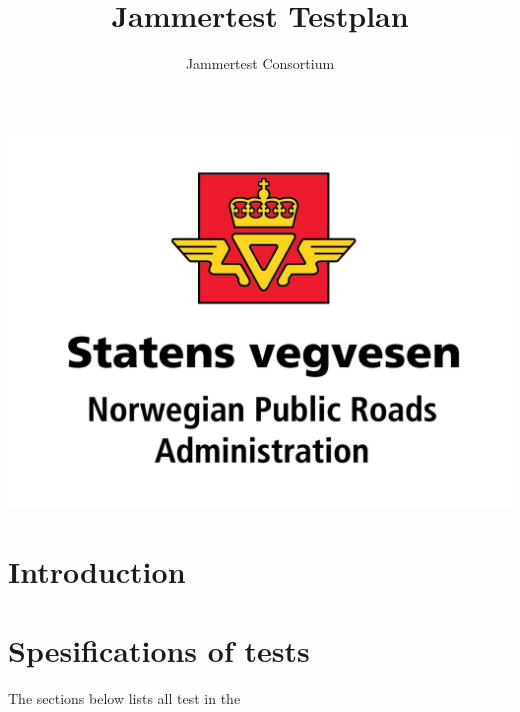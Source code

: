 \documentclass{article}
\title{Jammertest Testplan}
\author{Jammertest Consortium}
\date{ }
\begin{document}
\maketitle
\includegraphics[scale=0.1]{graphics/NPRA.png}

\tableofcontents




\section{Introduction}


\section{Spesifications of tests}
The sections below lists all test in the 

\end{document}

